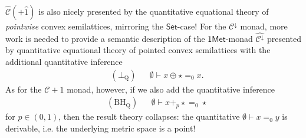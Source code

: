 \documentclass{article}
\newcommand{\cat}[1]{\mathsf{#1}}
\newcommand{\C}{\mathcal C}
\begin{document}
$\hat{\C}(+\hat{1})$ is also nicely presented by the quantitative equational theory of \emph{pointwise} convex semilattices, mirroring the $\cat{Set}$-case! For the $\mathcal C^\downarrow$ monad, more work is needed to provide a semantic description of the $\cat{1Met}$-monad $\hat{\mathcal C^\downarrow}$ presented by quantitative equational theory of pointed convex semilattices with the additional quantitative inference 
\[\begin{aligned}
&(\bot_\text{Q}) && \emptyset \vdash x \oplus \star =_0 x. 
\end{aligned}\]
As for the $\mathcal C+1$ monad, however, if we also add the quantitative inference
\[\begin{aligned}
&(\text{BH}_\text{Q}) && \emptyset \vdash x+_p \star =_0 \star 
\end{aligned}\]
for $p \in (0,1)$, then the result theory collapses: the quantitative $\emptyset \vdash x =_0 y$ is derivable, i.e. the underlying metric space is a point!




\end{document}
